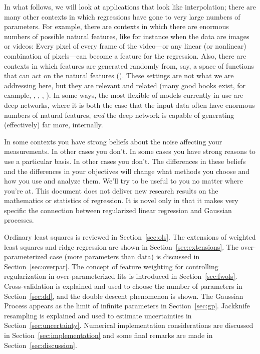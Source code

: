 \documentclass[12pt,letterpaper]{article}
\newcommand{\sectionname}{Section}
\begin{document}
In what follows, we will look at applications that look like interpolation; there are many other contexts in which regressions have gone to very large numbers of parameters.
For example, there are contexts in which there are enormous numbers of possible natural features, like for instance when the data are images or videos: Every pixel of every frame of the video---or any linear (or nonlinear) combination of pixels---can become a feature for the regression.
Also, there are contexts in which features are generated randomly from, say, a space of functions that can act on the natural features (\citealt{rahimi2007random}).
These settings are not what we are addressing here, but they are relevant and related
(many good books exist, for example, \citealt{bishop}, \citealt{esl}, \citealt{agresti}, \citealt{gelman}).
In some ways, the most flexible of models currently in use are deep networks, where it is both the case that the input data often have enormous numbers of natural features, \emph{and} the deep network is capable of generating (effectively) far more, internally.

In some contexts you have strong beliefs about the noise affecting your measurements. In other cases you don't.
In some cases you have strong reasons to use a particular basis.
In other cases you don't.
The differences in these beliefs and the differences in your objectives will change what methods you choose and how you use and analyze them.
We'll try to be useful to you no matter where you're at.
This document does not deliver new research results on the mathematics or statistics of regression.
It is novel only in that it makes very specific the connection between regularized linear regression and Gaussian processes.

Ordinary least squares is reviewed in \sectionname~\ref{sec:ols}.
The extensions of weighted least squares and ridge regression are shown in \sectionname~\ref{sec:extensions}.
The over-para\-meterized case (more parameters than data) is discussed in \sectionname~\ref{sec:overpar}.
The concept of feature weighting for controlling regularization in over-parameterized fits is introduced in \sectionname~\ref{sec:fwols}.
Cross-validation is explained and used to choose the number of parameters in \sectionname~\ref{sec:dd}, and the double descent phenomenon is shown.
The Gaussian Process appears as the limit of infinite parameters in \sectionname~\ref{sec:gp}.
Jackknife resampling is explained and used to estimate uncertainties in \sectionname~\ref{sec:uncertainty}.
Numerical implementation considerations are discussed in \sectionname~\ref{sec:implementation} and some final remarks are made in \sectionname~\ref{sec:discussion}.
\end{document}
